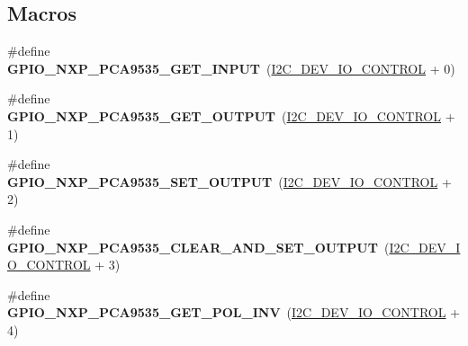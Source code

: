 \subsection*{Macros}
\begin{DoxyCompactItemize}
\item 
\mbox{\label{group__I2CGPIONXPPCA9535_gad7c81203b9a3fc8bca022cb505ed980c}} 
\#define {\bfseries G\+P\+I\+O\+\_\+\+N\+X\+P\+\_\+\+P\+C\+A9535\+\_\+\+G\+E\+T\+\_\+\+I\+N\+P\+UT}~(\mbox{\hyperlink{group__I2CDevice_gae8b74d1b5fc16a9c31e4da115b0ab004}{I2\+C\+\_\+\+D\+E\+V\+\_\+\+I\+O\+\_\+\+C\+O\+N\+T\+R\+OL}} + 0)
\item 
\mbox{\label{group__I2CGPIONXPPCA9535_ga4006f9c6805b377b2d3c814a5c7da429}} 
\#define {\bfseries G\+P\+I\+O\+\_\+\+N\+X\+P\+\_\+\+P\+C\+A9535\+\_\+\+G\+E\+T\+\_\+\+O\+U\+T\+P\+UT}~(\mbox{\hyperlink{group__I2CDevice_gae8b74d1b5fc16a9c31e4da115b0ab004}{I2\+C\+\_\+\+D\+E\+V\+\_\+\+I\+O\+\_\+\+C\+O\+N\+T\+R\+OL}} + 1)
\item 
\mbox{\label{group__I2CGPIONXPPCA9535_ga6e8ac87c1c8dd2e3d4c693e83074194c}} 
\#define {\bfseries G\+P\+I\+O\+\_\+\+N\+X\+P\+\_\+\+P\+C\+A9535\+\_\+\+S\+E\+T\+\_\+\+O\+U\+T\+P\+UT}~(\mbox{\hyperlink{group__I2CDevice_gae8b74d1b5fc16a9c31e4da115b0ab004}{I2\+C\+\_\+\+D\+E\+V\+\_\+\+I\+O\+\_\+\+C\+O\+N\+T\+R\+OL}} + 2)
\item 
\mbox{\label{group__I2CGPIONXPPCA9535_gacd1efbe0c25f1cb11a0aa393c02bbfe6}} 
\#define {\bfseries G\+P\+I\+O\+\_\+\+N\+X\+P\+\_\+\+P\+C\+A9535\+\_\+\+C\+L\+E\+A\+R\+\_\+\+A\+N\+D\+\_\+\+S\+E\+T\+\_\+\+O\+U\+T\+P\+UT}~(\mbox{\hyperlink{group__I2CDevice_gae8b74d1b5fc16a9c31e4da115b0ab004}{I2\+C\+\_\+\+D\+E\+V\+\_\+\+I\+O\+\_\+\+C\+O\+N\+T\+R\+OL}} + 3)
\item 
\mbox{\label{group__I2CGPIONXPPCA9535_ga28aa0416d543d58b1b74271a498b4fd1}} 
\#define {\bfseries G\+P\+I\+O\+\_\+\+N\+X\+P\+\_\+\+P\+C\+A9535\+\_\+\+G\+E\+T\+\_\+\+P\+O\+L\+\_\+\+I\+NV}~(\mbox{\hyperlink{group__I2CDevice_gae8b74d1b5fc16a9c31e4da115b0ab004}{I2\+C\+\_\+\+D\+E\+V\+\_\+\+I\+O\+\_\+\+C\+O\+N\+T\+R\+OL}} + 4)
\item 
\mbox{\label{group__I2CGPIONXPPCA9535_gaa1403880261b18ebfd3c598c4ffa74b1}} 

\end{DoxyCompactItemize}
